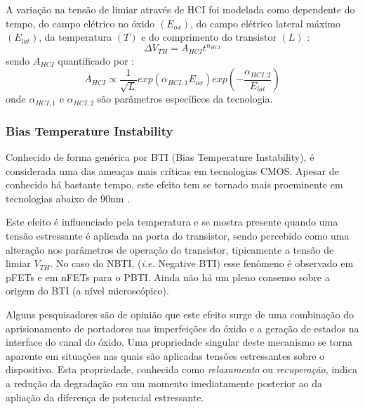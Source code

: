 A variação na tensão de limiar através de HCI foi modelada como dependente do tempo, do campo elétrico no óxido $(E_{ox})$, do campo elétrico lateral máximo $(E_{lat})$, da temperatura $(T)$ e do comprimento do transistor $(L)$ :
\begin{equation} \label{eq:HCI1}
\Delta V_{TH} = A_{HCI}t^{n_{HCI}}
\end{equation}
sendo $A_{HCI}$ quantificado por \cite{Maricau2008}\cite{Kufluoglu}\cite{ChenmingHu1985}:
\begin{equation} \label{eq:HCI2}
A_{HCI} \propto \frac{1}{\sqrt{L}}exp \left(\alpha_{HCI,1}E_{ox}\right)exp\left(-\frac{\alpha_{HCI,2}}{E_{lat}}\right)
\end{equation}
onde $\alpha_{HCI,1}$ e $\alpha_{HCI,2}$ são parâmetros específicos da tecnologia.

\subsubsection{Bias Temperature Instability}
\label{subsection_BTI}
Conhecido de forma genérica por BTI (Bias Temperature Instability), é considerada uma das ameaças mais críticas em tecnologias CMOS. Apesar de conhecido há bastante tempo, este efeito tem se tornado mais proeminente em tecnologias abaixo de 90nm \cite{Amat2009}.

Este efeito é influenciado pela temperatura e se mostra presente quando uma tensão estressante é aplicada na porta do transistor, sendo percebido como uma alteração nos parâmetros de operação do transistor, tipicamente a tensão de limiar $V_{TH}$. No caso do NBTI, (\textit{i.e.} Negative BTI) esse fenômeno é observado em pFETs e em nFETs para o PBTI. Ainda n\~{a}o há um pleno consenso sobre a origem do BTI (a n\'{i}vel microsc\'{o}pico).

Alguns pesquisadores s\~{a}o de opini\~{a}o que este efeito surge de uma combinaç\~{a}o do aprisionamento de portadores nas imperfeiç\~{o}es do \'{o}xido e a geraç\~{a}o de estados na interface do canal do \'{o}xido.
Uma propriedade singular deste mecanismo se torna aparente em situaç\~{o}es nas quais s\~{a}o aplicadas tens\~{o}es estressantes sobre o dispositivo. Esta propriedade, conhecida como \textit{relaxamento} ou \textit{recuperaç\~{a}o}, indica a reduç\~{a}o da degradaç\~{a}o em um momento imediatamente posterior ao da apliaç\~{a}o da diferença de potencial estressante.


